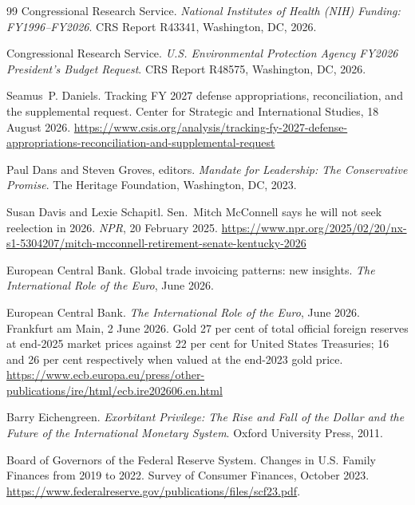 \documentclass[11pt,a4paper]{article}
\theoremstyle{remark}
\begin{document}
\begin{thebibliography}{99}
Congressional Research Service.
\newblock \emph{National Institutes of Health (NIH) Funding: FY1996--FY2026}.
\newblock CRS Report R43341, Washington, DC, 2026.

Congressional Research Service.
\newblock \emph{U.S. Environmental Protection Agency FY2026 President's Budget Request}.
\newblock CRS Report R48575, Washington, DC, 2026.

Seamus~P. Daniels.
\newblock Tracking FY 2027 defense appropriations, reconciliation, and the supplemental request.
\newblock Center for Strategic and International Studies, 18 August 2026.
\newblock \url{https://www.csis.org/analysis/tracking-fy-2027-defense-appropriations-reconciliation-and-supplemental-request}


Paul Dans and Steven Groves, editors.
\newblock \emph{Mandate for Leadership: The Conservative Promise}.
\newblock The Heritage Foundation, Washington, DC, 2023.

Susan Davis and Lexie Schapitl.
\newblock Sen.\ Mitch McConnell says he will not seek reelection in 2026.
\newblock \emph{NPR}, 20 February 2025.
\newblock \url{https://www.npr.org/2025/02/20/nx-s1-5304207/mitch-mcconnell-retirement-senate-kentucky-2026}


European Central Bank.
\newblock Global trade invoicing patterns: new insights.
\newblock \emph{The International Role of the Euro}, June 2026.

European Central Bank.
\newblock \emph{The International Role of the Euro}, June 2026.
\newblock Frankfurt am Main, 2 June 2026. Gold 27 per cent of total official foreign reserves at end-2025
market prices against 22 per cent for United States Treasuries; 16 and 26 per cent respectively when
valued at the end-2023 gold price.
\newblock \url{https://www.ecb.europa.eu/press/other-publications/ire/html/ecb.ire202606.en.html}

Barry Eichengreen.
\newblock \emph{Exorbitant Privilege: The Rise and Fall of the Dollar and the Future of the International Monetary System}.
\newblock Oxford University Press, 2011.

Board of Governors of the Federal Reserve System.
\newblock Changes in U.S. Family Finances from 2019 to 2022.
\newblock Survey of Consumer Finances, October 2023.
\newblock \url{https://www.federalreserve.gov/publications/files/scf23.pdf}.


\end{thebibliography}
\end{document}
